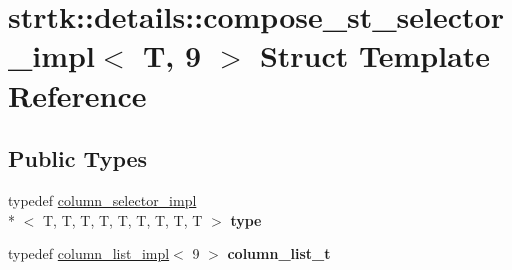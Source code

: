 \hypertarget{structstrtk_1_1details_1_1compose__st__selector__impl_3_01T_00_019_01_4}{\section{strtk\-:\-:details\-:\-:compose\-\_\-st\-\_\-selector\-\_\-impl$<$ T, 9 $>$ Struct Template Reference}
\label{structstrtk_1_1details_1_1compose__st__selector__impl_3_01T_00_019_01_4}
}
\subsection*{Public Types}
\begin{DoxyCompactItemize}
\item 
\hypertarget{structstrtk_1_1details_1_1compose__st__selector__impl_3_01T_00_019_01_4_a52da4fd2c661dbb4f1d5da9d84770acd}{typedef \hyperlink{classstrtk_1_1details_1_1column__selector__impl}{column\-\_\-selector\-\_\-impl}\\*
$<$ T, T, T, T, T, T, T, T, T $>$ {\bfseries type}}\label{structstrtk_1_1details_1_1compose__st__selector__impl_3_01T_00_019_01_4_a52da4fd2c661dbb4f1d5da9d84770acd}

\item 
\hypertarget{structstrtk_1_1details_1_1compose__st__selector__impl_3_01T_00_019_01_4_a71ddf315bac6a2b4518dfbd91ca6d54d}{typedef \hyperlink{structstrtk_1_1details_1_1column__list__impl}{column\-\_\-list\-\_\-impl}$<$ 9 $>$ {\bfseries column\-\_\-list\-\_\-t}}\label{structstrtk_1_1details_1_1compose__st__selector__impl_3_01T_00_019_01_4_a71ddf315bac6a2b4518dfbd91ca6d54d}

\end{DoxyCompactItemize}
